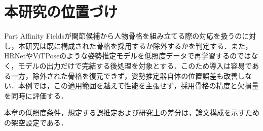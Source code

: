 \section{本研究の位置づけ}

Part Affinity Fields\cite{cao2017partaffinity}が関節候補から人物骨格を組み立てる際の対応を扱うのに対し，本研究は既に構成された骨格を採用するか除外するかを判定する．また，HRNet\cite{sun2019hrnet}やViTPose\cite{xu2022vitpose}のような姿勢推定モデルを低照度データで再学習するのではなく，モデルの出力だけで完結する後処理を対象とする．このため導入は容易である一方，除外された骨格を復元できず，姿勢推定器自体の位置誤差も改善しない．本例では，この適用範囲を越えて性能を主張せず，採用骨格の精度と欠損量を同時に評価する．

本章の低照度条件，想定する誤推定および研究上の差分は，論文構成を示すための架空設定である．
